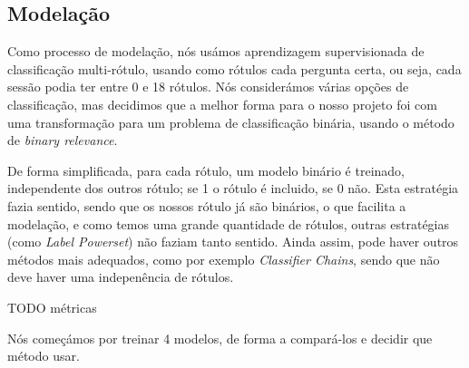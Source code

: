 \documentclass[justified, 11pt]{scrartcl}
\begin{document}
  \subsection{Modelação}
  Como processo de modelação, nós usámos aprendizagem supervisionada de classificação multi-rótulo, usando como rótulos cada pergunta certa, ou seja, cada sessão podia ter entre 0 e 18 rótulos. Nós considerámos várias opções de classificação, mas decidimos que a melhor forma para o nosso projeto foi com uma transformação para um problema de classificação binária, usando o método de \textit{binary relevance}.
  
  De forma simplificada, para cada rótulo, um modelo binário é treinado, independente dos outros rótulo; se 1 o rótulo é incluido, se 0 não. Esta estratégia fazia sentido, sendo que os nossos rótulo já são binários, o que facilita a modelação, e como temos uma grande quantidade de rótulos, outras estratégias (como \textit{Label Powerset}) não faziam tanto sentido. Ainda assim, pode haver outros métodos mais adequados, como por exemplo \textit{Classifier Chains}, sendo que não deve haver uma indepenência de rótulos.

  TODO métricas

  Nós começámos por treinar 4 modelos, de forma a compará-los e decidir que método usar.
  
\end{document}
